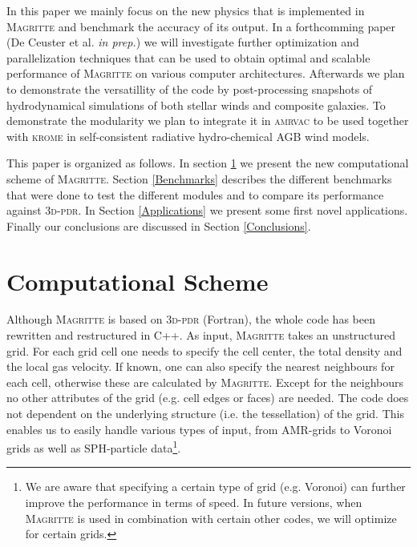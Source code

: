\documentclass[a4paper,fleqn,usenatbib]{mnras}
\begin{document}
In this paper we mainly focus on the new physics that is implemented in \textsc{Magritte} and benchmark the accuracy of its output. In a forthcomming paper (De Ceuster et al. \textit{in prep.}) we will investigate further optimization and parallelization techniques that can be used to obtain optimal and scalable performance of \textsc{Magritte} on various computer architectures. Afterwards we plan to demonstrate the versatillity of the code by post-processing snapshots of hydrodynamical simulations of both stellar winds and composite galaxies. To demonstrate the modularity we plan to integrate it in \textsc{amrvac} \citep{Xia2018} to be used together with \textsc{krome} \citep{Grassi2014} in self-consistent radiative hydro-chemical AGB wind models.

This paper is organized as follows. In section \ref{Computational} we present the new computational scheme of \textsc{Magritte}. Section \ref{Benchmarks} describes the different benchmarks that were done to test the different modules and to compare its performance against \textsc{3d-pdr}. In Section \ref{Applications} we present some first novel applications. Finally our conclusions are discussed in Section \ref{Conclusions}.


\section{Computational Scheme}
\label{Computational}

Although \textsc{Magritte} is based on \textsc{3d-pdr} (Fortran), the whole code has been rewritten and restructured in C++. As input, \textsc{Magritte} takes an unstructured grid. For each grid cell one needs to specify the cell center, the total density and the local gas velocity. If known, one can also specify the nearest neighbours for each cell, otherwise these are calculated by \textsc{Magritte}. Except for the neighbours no other attributes of the grid (e.g. cell edges or faces) are needed. The code does not dependent on the underlying structure (i.e. the tessellation) of the grid. This enables us to easily handle various types of input, from AMR-grids to Voronoi grids as well as SPH-particle data\footnote{We are aware that specifying a certain type of grid (e.g. Voronoi) can further improve the performance in terms of speed. In future versions, when \textsc{Magritte} is used in combination with certain other codes, we will optimize for certain grids.}.
\end{document}
